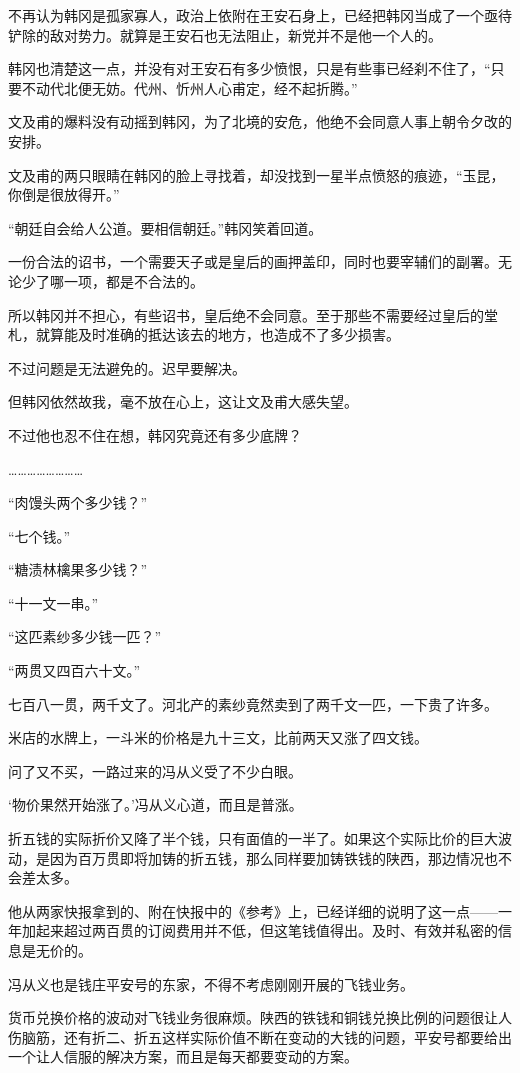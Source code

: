不再认为韩冈是孤家寡人，政治上依附在王安石身上，已经把韩冈当成了一个亟待铲除的敌对势力。就算是王安石也无法阻止，新党并不是他一个人的。

韩冈也清楚这一点，并没有对王安石有多少愤恨，只是有些事已经刹不住了，“只要不动代北便无妨。代州、忻州人心甫定，经不起折腾。”

文及甫的爆料没有动摇到韩冈，为了北境的安危，他绝不会同意人事上朝令夕改的安排。

文及甫的两只眼睛在韩冈的脸上寻找着，却没找到一星半点愤怒的痕迹，“玉昆，你倒是很放得开。”

“朝廷自会给人公道。要相信朝廷。”韩冈笑着回道。

一份合法的诏书，一个需要天子或是皇后的画押盖印，同时也要宰辅们的副署。无论少了哪一项，都是不合法的。

所以韩冈并不担心，有些诏书，皇后绝不会同意。至于那些不需要经过皇后的堂札，就算能及时准确的抵达该去的地方，也造成不了多少损害。

不过问题是无法避免的。迟早要解决。

但韩冈依然故我，毫不放在心上，这让文及甫大感失望。

不过他也忍不住在想，韩冈究竟还有多少底牌？

……………………

“肉馒头两个多少钱？”

“七个钱。”

“糖渍林檎果多少钱？”

“十一文一串。”

“这匹素纱多少钱一匹？”

“两贯又四百六十文。”

七百八一贯，两千文了。河北产的素纱竟然卖到了两千文一匹，一下贵了许多。

米店的水牌上，一斗米的价格是九十三文，比前两天又涨了四文钱。

问了又不买，一路过来的冯从义受了不少白眼。

‘物价果然开始涨了。’冯从义心道，而且是普涨。

折五钱的实际折价又降了半个钱，只有面值的一半了。如果这个实际比价的巨大波动，是因为百万贯即将加铸的折五钱，那么同样要加铸铁钱的陕西，那边情况也不会差太多。

他从两家快报拿到的、附在快报中的《参考》上，已经详细的说明了这一点——一年加起来超过两百贯的订阅费用并不低，但这笔钱值得出。及时、有效并私密的信息是无价的。

冯从义也是钱庄平安号的东家，不得不考虑刚刚开展的飞钱业务。

货币兑换价格的波动对飞钱业务很麻烦。陕西的铁钱和铜钱兑换比例的问题很让人伤脑筋，还有折二、折五这样实际价值不断在变动的大钱的问题，平安号都要给出一个让人信服的解决方案，而且是每天都要变动的方案。

